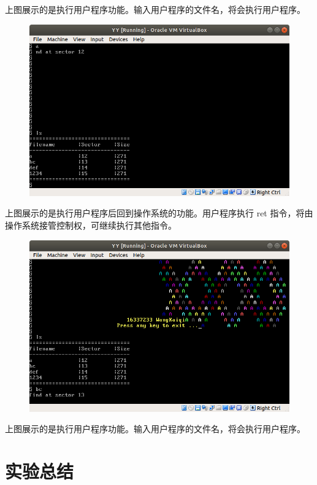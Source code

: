 \documentclass{article}
\begin{document}
上图展示的是执行用户程序功能。输入用户程序的文件名，将会执行用户程序。

\newpage

\begin{figure}[!hbp]
	\centering
	\includegraphics[scale=0.55]{pics/5.png}
\end{figure}

上图展示的是执行用户程序后回到操作系统的功能。用户程序执行 ret 指令，将由操作系统接管控制权，可继续执行其他指令。

\begin{figure}[!hbp]
	\centering
	\includegraphics[scale=0.55]{pics/6.png}
\end{figure}

上图展示的是执行用户程序功能。输入用户程序的文件名，将会执行用户程序。

\newpage



\section{实验总结}
\end{document}
